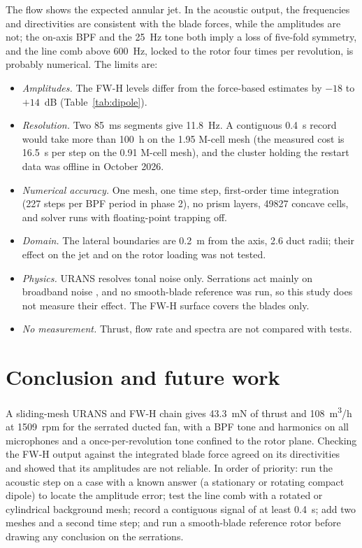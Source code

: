 \documentclass[11pt]{article}
\begin{document}
The flow shows the expected annular jet. In the acoustic output, the frequencies and directivities are consistent with
the blade forces, while the amplitudes are not; the on-axis BPF and the \SI{25}{Hz} tone both imply a loss of
five-fold symmetry, and the line comb above \SI{600}{Hz}, locked to the rotor four times per revolution, is probably numerical. The limits are:
\begin{itemize}
  \item \emph{Amplitudes.} The FW-H levels differ from the force-based estimates by $-18$ to $+14$~dB
    (Table~\ref{tab:dipole}).
  \item \emph{Resolution.} Two \SI{85}{ms} segments give \SI{11.8}{Hz}. A contiguous \SI{0.4}{s} record would take
    more than \SI{100}{h} on the 1.95 M-cell mesh (the measured cost is \SI{16.5}{s} per step on the 0.91 M-cell mesh),
    and the cluster holding the restart data was offline in October 2026.
  \item \emph{Numerical accuracy.} One mesh, one time step, first-order time integration (227 steps per BPF period in
    phase 2), no prism layers, \num{49827} concave cells, and solver runs with floating-point trapping off.
  \item \emph{Domain.} The lateral boundaries are \SI{0.2}{m} from the axis, 2.6 duct radii; their effect on the jet
    and on the rotor loading was not tested.
  \item \emph{Physics.} URANS resolves tonal noise only. Serrations act mainly on broadband noise
    \citep{howe1991,lyu2016}, and no smooth-blade reference was run, so this study does not measure their effect. The
    FW-H surface covers the blades only.
  \item \emph{No measurement.} Thrust, flow rate and spectra are not compared with tests.
\end{itemize}

\section{Conclusion and future work}

A sliding-mesh URANS and FW-H chain gives \SI{43.3}{mN} of thrust and \SI{108}{m^3/h} at \SI{1509}{rpm} for the
serrated ducted fan, with a BPF tone and harmonics on all microphones and a once-per-revolution tone confined to the
rotor plane. Checking the FW-H output against the integrated blade force agreed on its directivities and showed that
its amplitudes are not reliable. In order of priority: run the acoustic step on a case with a known answer (a
stationary or rotating compact dipole) to locate the amplitude error; test the line comb with a rotated or cylindrical background
mesh; record a contiguous signal of at least \SI{0.4}{s}; add two meshes and a second time step; and run
a smooth-blade reference rotor before drawing any conclusion on the serrations.
\end{document}
